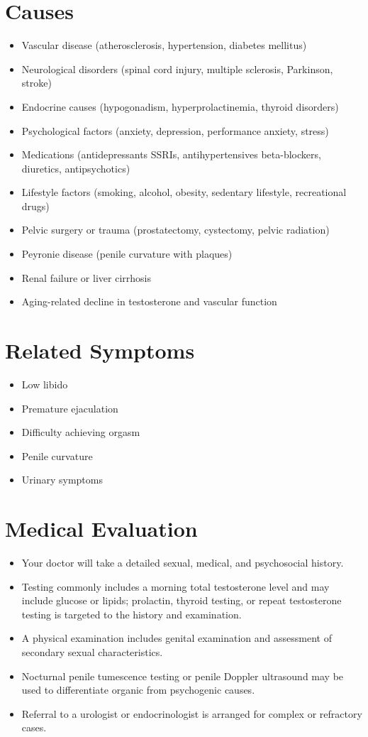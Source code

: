 \section*{Causes}
\begin{itemize}
  \item Vascular disease (atherosclerosis, hypertension, diabetes mellitus)
  \item Neurological disorders (spinal cord injury, multiple sclerosis, Parkinson, stroke)
  \item Endocrine causes (hypogonadism, hyperprolactinemia, thyroid disorders)
  \item Psychological factors (anxiety, depression, performance anxiety, stress)
  \item Medications (antidepressants SSRIs, antihypertensives beta-blockers, diuretics, antipsychotics)
  \item Lifestyle factors (smoking, alcohol, obesity, sedentary lifestyle, recreational drugs)
  \item Pelvic surgery or trauma (prostatectomy, cystectomy, pelvic radiation)
  \item Peyronie disease (penile curvature with plaques)
  \item Renal failure or liver cirrhosis
  \item Aging-related decline in testosterone and vascular function
\end{itemize}

\section*{Related Symptoms}
\begin{itemize}
  \item Low libido
  \item Premature ejaculation
  \item Difficulty achieving orgasm
  \item Penile curvature
  \item Urinary symptoms
\end{itemize}

\section*{Medical Evaluation}
\begin{itemize}
  \item Your doctor will take a detailed sexual, medical, and psychosocial history.
  \item Testing commonly includes a morning total testosterone level and may include glucose or lipids; prolactin, thyroid testing, or repeat testosterone testing is targeted to the history and examination.
  \item A physical examination includes genital examination and assessment of secondary sexual characteristics.
  \item Nocturnal penile tumescence testing or penile Doppler ultrasound may be used to differentiate organic from psychogenic causes.
  \item Referral to a urologist or endocrinologist is arranged for complex or refractory cases.
\end{itemize}

